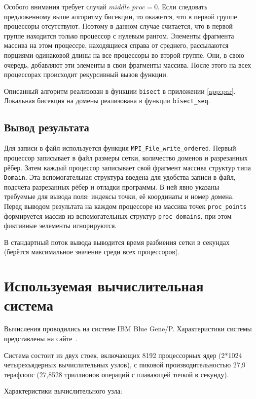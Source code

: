 \documentclass[oneside,final,14pt]{extreport}
\begin{document}
Особого внимания требует случай $middle\_proc = 0$. Если следовать
предложенному выше алгоритму бисекции, то окажется, что
в первой группе процессоры отсутствуют. Поэтому в данном случае считается,
что в первой группе находится только процессор с нулевым рангом.
Элементы фрагмента массива на этом процессре, находящиеся справа от среднего,
рассылаются порциями одинаковой длины на все процессоры во второй группе.
Они, в свою очередь, добавляют эти элементы в свои фрагменты массива.
После этого на всех процессорах происходит рекурсивный вызов функции.

Описанный алгоритм реализован в функции \texttt{bisect} в приложении
\ref{app:par}. Локальная бисекция на домены реализована в функции
\texttt{bisect\_seq}.

\section*{Вывод результата}

Для записи в файл используется функция \texttt{MPI\_File\_write\_ordered}.
Первый процессор записывает в файл размеры сетки, количество доменов и
разрезанных рёбер. Затем каждый процессор записывает свой фрагмент массива
структур типа \texttt{Domain}. Эта вспомогательная структура введена для
удобства записи в файл, подсчёта разрезанных рёбер и отладки программы. В ней явно указаны требуемые для
вывода поля: индексы точки, её координаты и номер домена. Перед выводом
результата на каждом процессоре из массива точек \texttt{proc\_points}
формируется массив из вспомогательных структур \texttt{proc\_domains}, при этом
фиктивные эелементы игнорируются.

В стандартный поток вывода выводится время разбиения сетки в секундах
(берётся максимальное значение среди всех процессоров).

\chapter*{Используемая вычислительная система}

Вычисления проводились на системе IBM Blue Gene/P.
Характеристики системы представлены на сайте~\cite{bluegene}.

Система состоит из двух стоек, включающих 8192 процессорных ядер
(2*1024 четырехъядерных вычислительных узлов), с пиковой производительностью
27,9 терафлопс (27,8528 триллионов операций с плавающей точкой в секунду).

Характеристики вычислительного узла:
\end{document}
